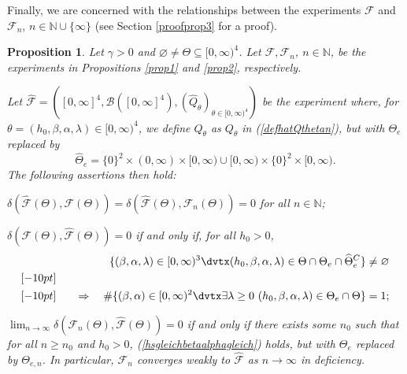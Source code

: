 \documentclass[number,citesort,seceqn,dvips]{arxbj}
\newcommand{\eqref}[1]{(\ref{#1})}
\newtheorem{proposition}{Proposition}[section]
\newcommand{\NN}{\mathbb{N}}
\newcommand{\BBB}{{\mathcal B}}
\newcommand{\FFF}{{\mathcal F}}
\begin{document}
Finally, we are concerned with the relationships between the
experiments $\FFF$ and $\FFF_n$, $n\in\NN\cup\{\infty\}$ (see
Section \ref{proofprop3} for a proof).\vadjust{\goodbreak}
%
\begin{proposition}\label{prop3} Let $\gamma>0$ and $\varnothing\neq
\Theta\subseteq[0,\infty)^4$. Let $\FFF, \FFF_n$, $n\in\NN$,
be the experiments in Propositions \ref{prop1} and \ref{prop2},
respectively.

Let $\widehat\FFF= ([0,\infty]^4,\BBB([0,\infty]^4),(\widehat
Q_\theta)_{\theta\in[0,\infty)^4} )$ be the experiment where, for
$\theta=(h_0,\beta,\alpha,\lambda)\in[0,\infty)^4$, we define
$\widehat
Q_{\theta}$ as $Q_{\theta}$ in \eqref{defhatQthetan}, but with
$\Theta_e$ replaced by
%
\[
\widehat\Theta_{e} = \{0\}^2\times(0,\infty)\times[0,\infty
)\cup[0,\infty)\times\{0\}^2\times[0,\infty) .
\]
%
The following assertions then hold:
\begin{longlist}
\item
$\delta(\widehat\FFF(\Theta),\FFF(\Theta))=\delta(\widehat\FFF
(\Theta),\FFF_n(\Theta))=0$
for all $n\in\NN$;
\item $\delta(\FFF(\Theta),\widehat\FFF(\Theta))=0$ if and
only if, for all $h_0>0$,
%
\begin{eqnarray}\label{hsgleichbetaalphagleich}
 &&\{(\beta,\alpha,\lambda)\in[0,\infty)^3\dvtx
(h_0,\beta,\alpha,\lambda)\in\Theta\cap\Theta_e\cap
\widehat\Theta_e^C \}\neq\varnothing\nonumber\\ [-10pt]\\ [-10pt]
&&\quad\Rightarrow\quad
\# \{(\beta ,\alpha)\in[0,\infty)^2 \dvtx \exists\lambda\ge
0\ (h_0,\beta,\alpha,\lambda)\in\Theta_e\cap\Theta \}=1;\nonumber
\end{eqnarray}
%
\item   $\lim_{n\to\infty}
\delta(\FFF_n(\Theta),\widehat\FFF(\Theta))=0$ if and only if there
exists some $n_0$ such that for all $n\ge n_0$ and $h_0>0$,
\eqref{hsgleichbetaalphagleich} holds, but with $\Theta_{e}$ replaced
by $\Theta_{e,n}$. In particular, $\FFF_n$ converges weakly to
$\widehat\FFF$ as $n\to\infty$ in deficiency.
\end{longlist}
\end{proposition}
\end{document}
